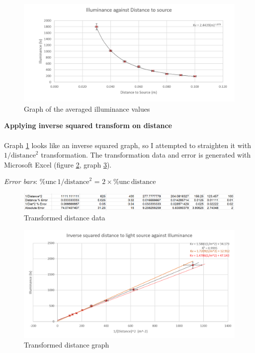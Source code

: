 \documentclass[a4paper,12pt]{article}
\newcommand{\relun}{\% \text{unc}\,}
\newcommand{\paragraphnl}[1]{\textbf{#1}\\\\}
\begin{document}
\begin{figure}[H]
    \centering
    \includegraphics[width=\textwidth]{assets/averagegraph.png}
    \caption{Graph of the averaged illuminance values}
    \label{gph:average}
\end{figure}


\paragraphnl{Applying inverse squared transform on distance}
Graph \ref{gph:average} looks like an inverse squared graph, so I attempted to straighten it with $1/{\text{distance}}^2$ transformation. The transformation data and error is generated with Microsoft Excel (figure \ref{fig:tdata}, graph \ref{gph:tdata}).

\textit{Error bars}: $\relun 1/{\text{distance}}^2$ = $2 \times \relun \text{distance}$

\begin{figure}[H]
    \centering
    \includegraphics[width=\textwidth]{assets/transformdata.png}
    \caption{Transformed distance data}
    \label{fig:tdata}
\end{figure}

\begin{figure}[H]
    \centering
    \includegraphics[width=\textwidth]{assets/transformgraph.png}
    \caption{Transformed distance graph}
    \label{gph:tdata}
\end{figure}
\end{document}
